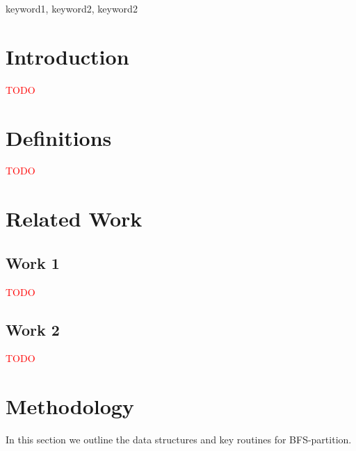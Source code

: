 \documentclass[conference]{IEEEtran}
\begin{document}
\begin{IEEEkeywords}
keyword1, keyword2, keyword2
\end{IEEEkeywords}

\section{Introduction}
\textcolor{red}{TODO}

\section{Definitions}
\textcolor{red}{TODO}

\section{Related Work}

\subsection{Work 1}

\textcolor{red}{TODO}
\cite{parmetis}

\subsection{Work 2}

\textcolor{red}{TODO}

\section{Methodology}
In this section we outline the data structures and key routines for BFS-partition.
\end{document}
